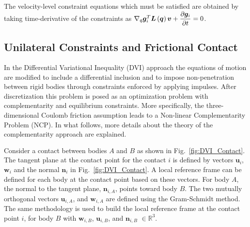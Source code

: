 The velocity-level constraint equations which must be satisfied are obtained by taking time-derivative of the constraints as  $\nabla_q \boldsymbol{g}_i^T \boldsymbol{L}\left(\boldsymbol{q}\right)\boldsymbol{v}+\dfrac{\partial\boldsymbol{g}_i}{\partial t}=0$.

\subsection{Unilateral Constraints and Frictional Contact}\label{sec:DVI}
In the Differential Variational Inequality (DVI) \cite{pastew03dvi} approach the equations of motion are modified to include a differential inclusion \cite{filippov1967classical} and to impose non-penetration between rigid bodies through constraints enforced by applying impulses. After discretization this problem is posed as an optimization problem with complementarity and equilibrium constraints. More specifically, the three-dimensional Coulomb friction assumption leads to a Non-linear Complementarity Problem (NCP).  In what follows, more details about the theory of the complementarity approach are explained.

Consider a contact between bodies $A$ and $B$ as shown in Fig.~\ref{fig:DVI_Contact}. The tangent plane at the contact point for the contact $i$ is defined by vectors $\textbf{u}_i$, $\textbf{w}_i$ and the normal $\textbf{n}_i$ in Fig.~\ref{fig:DVI_Contact}. A local reference frame can be defined for each body at the contact point based on these vectors. For body $A$, the normal to the tangent plane, $\textbf{n}_{i,A}$, points toward body $B$. The two mutually orthogonal vectors $\textbf{u}_{i,A}$, and $\textbf{w}_{i,A}$ are defined using the Gram-Schmidt method. The same methodology is used to build the local reference frame at the contact point $i$, for body $B$ with $\textbf{w}_{i,B}$, $\textbf{u}_{i,B}$, and $\textbf{n}_{i,B}$ $\in \mathbb{R}^3$. 



